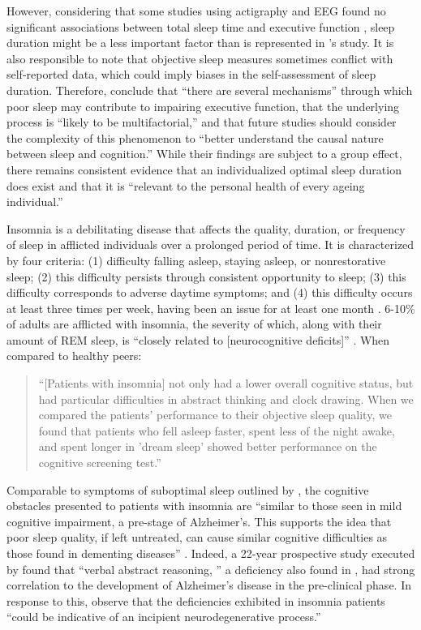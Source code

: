 \documentclass[stu, 12pt]{apa7}
\begin{document}
However, considering that some studies using actigraphy and EEG found no significant associations between total sleep time and executive function \parencite{12, 13}, sleep duration might be a less important factor than is represented in \citeauthor{2}'s study. It is also responsible to note that objective sleep measures sometimes conflict with self-reported data, which could imply biases in the self-assessment of sleep duration. Therefore, \citeauthor{2} conclude that ``there are several mechanisms'' through which poor sleep may contribute to impairing executive function, that the underlying process is ``likely to be multifactorial,'' and that future studies should consider the complexity of this phenomenon to ``better understand the causal nature between sleep and cognition.'' While their findings are subject to a group effect, there remains consistent evidence that an individualized optimal sleep duration does exist and that it is ``relevant to the personal health of every ageing individual.'' \parencite{2} 

Insomnia is a debilitating disease that affects the quality, duration, or frequency of sleep in afflicted individuals over a prolonged period of time. It is characterized by four criteria: (1) difficulty falling asleep, staying asleep, or nonrestorative sleep; (2) this difficulty persists through consistent opportunity to sleep; (3) this difficulty corresponds to adverse daytime symptoms; and (4) this difficulty occurs at least three times per week, having been an issue for at least one month \parencite{14}. 6-10\% of adults are afflicted with insomnia, the severity of which, along with their amount of REM sleep, is ``closely related to [neurocognitive deficits]'' \parencite{3}. When compared to healthy peers:
\begin{quote}

	``[Patients with insomnia] not only had a lower overall cognitive status, but had particular difficulties in abstract thinking and clock drawing. When we compared the patients’ performance to their objective sleep quality, we found that patients who fell asleep faster, spent less of the night awake, and spent longer in 'dream sleep' showed better performance on the cognitive screening test.'' \parencite{3}

\end{quote}
Comparable to symptoms of suboptimal sleep outlined by \cite{2}, the cognitive obstacles presented to patients with insomnia are ``similar to those seen in mild cognitive impairment, a pre-stage of Alzheimer’s. This supports the idea that poor sleep quality, if left untreated, can cause similar cognitive difficulties as those found in dementing diseases'' \parencite{3}. Indeed, a 22-year prospective study executed by \cite{15} found that ``verbal abstract reasoning, '' a deficiency also found in \cite{3}, had strong correlation to the development of Alzheimer's disease in the pre-clinical phase. In response to this, \citeauthor{3} observe that the deficiencies exhibited in insomnia patients ``could be indicative of an incipient neurodegenerative process.''
\end{document}
